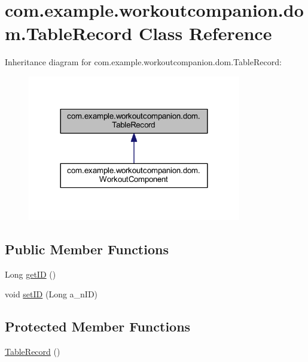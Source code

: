\hypertarget{classcom_1_1example_1_1workoutcompanion_1_1dom_1_1_table_record}{\section{com.\-example.\-workoutcompanion.\-dom.\-Table\-Record Class Reference}
\label{classcom_1_1example_1_1workoutcompanion_1_1dom_1_1_table_record}
}


Inheritance diagram for com.\-example.\-workoutcompanion.\-dom.\-Table\-Record\-:
\nopagebreak
\begin{figure}[H]
\begin{center}
\leavevmode
\includegraphics[width=264pt]{classcom_1_1example_1_1workoutcompanion_1_1dom_1_1_table_record__inherit__graph}
\end{center}
\end{figure}
\subsection*{Public Member Functions}
\begin{DoxyCompactItemize}
\item 
Long \hyperlink{classcom_1_1example_1_1workoutcompanion_1_1dom_1_1_table_record_aaad8f1c67d8e69fbc651322d5e40a2fc}{get\-I\-D} ()
\item 
void \hyperlink{classcom_1_1example_1_1workoutcompanion_1_1dom_1_1_table_record_a391da9c1bd03df54429f6b64602df2ce}{set\-I\-D} (Long a\-\_\-n\-I\-D)
\end{DoxyCompactItemize}
\subsection*{Protected Member Functions}
\begin{DoxyCompactItemize}
\item 
\hyperlink{classcom_1_1example_1_1workoutcompanion_1_1dom_1_1_table_record_af45541b51d998b04d359ffae63569773}{Table\-Record} ()
\end{DoxyCompactItemize}

